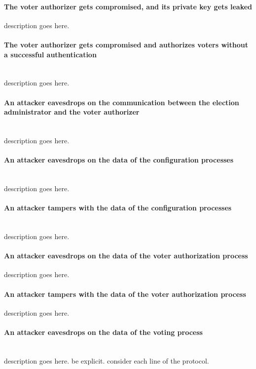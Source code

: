\paragraph{The voter authorizer gets compromised, and its private key gets leaked}
description goes here.


\paragraph{The voter authorizer gets compromised and authorizes voters without a successful authentication} \mbox{} \\
description goes here.


\paragraph{An attacker eavesdrops on the communication between the election administrator and the voter authorizer} \mbox{} \\
description goes here.


\paragraph{An attacker eavesdrops on the data of the configuration processes} \mbox{} \\
description goes here.


\paragraph{An attacker tampers with the data of the configuration processes} \mbox{} \\
description goes here.


\paragraph{An attacker eavesdrops on the data of the voter authorization process}
description goes here.


\paragraph{An attacker tampers with the data of the voter authorization process}
description goes here.


\paragraph{An attacker eavesdrops on the data of the voting process} \mbox{} \\
description goes here.
be explicit.
consider each line of the protocol.


